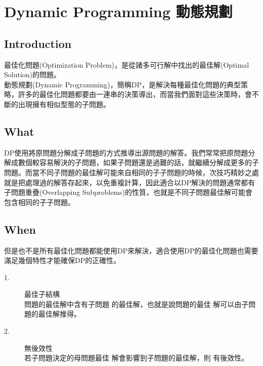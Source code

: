 \documentclass{article}
\begin{document}
\section{Dynamic Programming 動態規劃}
\subsection*{Introduction}
最佳化問題(Optimization Problem)，是從諸多可行解中找出的最佳解(Optimal Solution)的問題。 \\
動態規劃(Dynamic Programming)，簡稱DP，是解決每種最佳化問題的典型策略，許多的最佳化問題都要由一連串的決策導出，而當我們面對這些決策時，會不斷的出現擁有相似型態的子問題。\\

\subsection{What}
DP使用將原問題分解成子問題的方式推導出源問題的解答。我們常常把原問題分解成數個較容易解決的子問題，如果子問題還是過難的話，就繼續分解成更多的子問題。而當不同子問題的最佳解可能來自相同的子子問題的時候，次技巧精妙之處就是把處理過的解答存起來，以免重複計算，因此適合以DP解決的問題通常都有子問題重疊(Overlapping Subproblems)的性質，也就是不同子問題最佳解可能會包含相同的子子問題。

\subsection{When}但是也不是所有最佳化問題都能使用DP來解決，適合使用DP的最佳化問題也需要滿足幾個特性才能確保DP的正確性。
\begin{description}
\item[ 1.]最佳子結構\\
問題的最佳解中含有子問題 的最佳解，也就是說問題的最佳 解可以由子問題的最佳解推得。
\item[ 2.]無後效性\\
若子問題決定的母問題最佳 解會影響到子問題的最佳解，則 有後效性。
\end{description}
\end{document}
